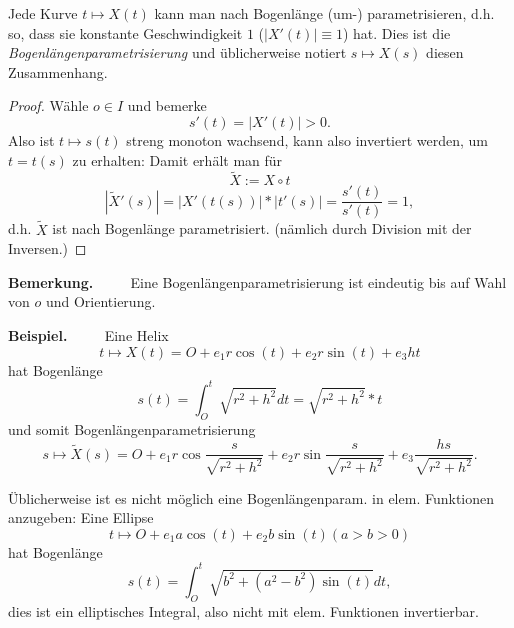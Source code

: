 \documentclass[a4paper,oneside,11pt,DIV=12,parskip=half]{scrartcl}
\newenvironment{note}{\textbf{Bemerkung.} ~~~~}{}
\newenvironment{example}{\textbf{Beispiel.} ~~~~}{}
\newenvironment{lemma, definition}{\textbf{Lemma und Definition.} ~~~~}{}
\newenvironment{note, example}{\textbf{Bemerkung und Beispiel.} ~~~~}{}
\begin{document}
\begin{lemma, definition}
	Jede Kurve $t \mapsto X(t)$ kann man nach Bogenlänge (um-) parametrisieren, d.h. so, dass sie konstante Geschwindigkeit $1$ ($|X'(t)|\equiv 1$) hat.
	Dies ist die \textit{Bogenlängenparametrisierung} und üblicherweise notiert $s \mapsto X(s)$ diesen Zusammenhang.
\end{lemma, definition}
\begin{proof}
	Wähle $o \in I$ und bemerke \[s'(t) = |X'(t)| > 0.\]
	Also ist $t \mapsto s(t)$ streng monoton wachsend, kann also invertiert werden, um $t= t(s)$ zu erhalten: Damit erhält man für 
	\[\widetilde{X}:=X\circ t\]
	\[|\widetilde{X}'(s)|= |X'(t(s))|*|t'(s)| = \frac{s'(t)}{s'(t)}= 1,\]
	d.h. $\widetilde{X}$ ist nach Bogenlänge parametrisiert. (nämlich durch Division mit der Inversen.)
\end{proof}

\begin{note}
	Eine Bogenlängenparametrisierung ist eindeutig bis auf Wahl von $o$ und Orientierung.
\end{note}

\begin{example}
	Eine Helix \[t \mapsto X(t) = O + e_1r\cos(t)+e_2r\sin(t)+ e_3ht\]
	hat Bogenlänge \[s(t) = \int_{O}^{t} \sqrt{r^2 + h^2}dt = \sqrt{r^2+h^2}*t\]
	und somit Bogenlängenparametrisierung \[s \mapsto \widetilde{X}(s)= O + e_1r\cos\frac{s}{\sqrt{r^2+h^2}}+e_2r\sin\frac{s}{\sqrt{r^2+h^2}}+ e_3\frac{hs}{\sqrt{r^2+h^2}}.\]
\end{example}

\begin{note, example}
	
	Üblicherweise ist es nicht möglich eine Bogenlängenparam. in elem. Funktionen anzugeben: Eine Ellipse\[t \mapsto O + e_1a\cos(t)+e_2b\sin(t) (a>b>0)\]
	hat Bogenlänge
	\[s(t) = \int_{O}^{t} \sqrt{b^2 + ( a^2-b^2)\sin(t)}dt,\]
	dies ist ein elliptisches Integral, also nicht mit elem. Funktionen invertierbar.

\end{note, example}
\end{document}
